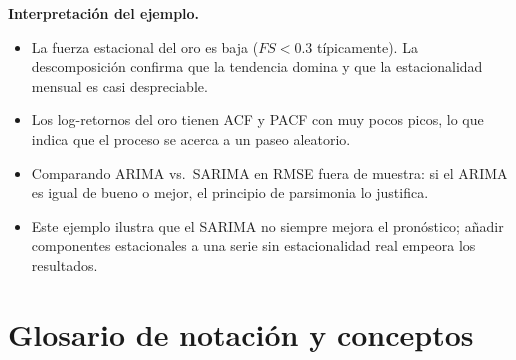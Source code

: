 \documentclass[12pt,a4paper]{article}
\theoremstyle{definition}
\begin{document}
\noindent\textbf{Interpretación del ejemplo.}
\begin{itemize}[nosep]
  \item La fuerza estacional del oro es baja ($FS < 0.3$ típicamente). La
        descomposición confirma que la tendencia domina y que la estacionalidad
        mensual es casi despreciable.
  \item Los log-retornos del oro tienen ACF y PACF con muy pocos picos, lo que
        indica que el proceso se acerca a un paseo aleatorio.
  \item Comparando ARIMA vs.\ SARIMA en RMSE fuera de muestra: si el ARIMA
        es igual de bueno o mejor, el principio de parsimonia lo justifica.
  \item Este ejemplo ilustra que el SARIMA no siempre mejora el pronóstico;
        añadir componentes estacionales a una serie sin estacionalidad real
        empeora los resultados.
\end{itemize}

\section{Glosario de notación y conceptos}
\end{document}
